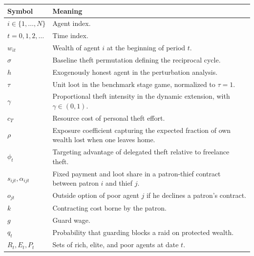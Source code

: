 \begin{tabular}{p{}p{}}
\toprule
Symbol & Meaning \\
\midrule
$i \in \{1,\dots,N\}$ & Agent index. \\
$t = 0,1,2,\dots$ & Time index. \\
$w_{it}$ & Wealth of agent $i$ at the beginning of period $t$. \\
$\sigma$ & Baseline theft permutation defining the reciprocal cycle. \\
$h$ & Exogenously honest agent in the perturbation analysis. \\
$\tau$ & Unit loot in the benchmark stage game, normalized to $\tau = 1$. \\
$\gamma$ & Proportional theft intensity in the dynamic extension, with $\gamma \in (0,1)$. \\
$c_T$ & Resource cost of personal theft effort. \\
$\rho$ & Exposure coefficient capturing the expected fraction of own wealth lost when one leaves home. \\
$\phi_t$ & Targeting advantage of delegated theft relative to freelance theft. \\
$s_{ijt}, \alpha_{ijt}$ & Fixed payment and loot share in a patron-thief contract between patron $i$ and thief $j$. \\
$o_{jt}$ & Outside option of poor agent $j$ if he declines a patron's contract. \\
$k$ & Contracting cost borne by the patron. \\
$g$ & Guard wage. \\
$q_t$ & Probability that guarding blocks a raid on protected wealth. \\
$R_t, E_t, P_t$ & Sets of rich, elite, and poor agents at date $t$. \\
\bottomrule
\end{tabular}
